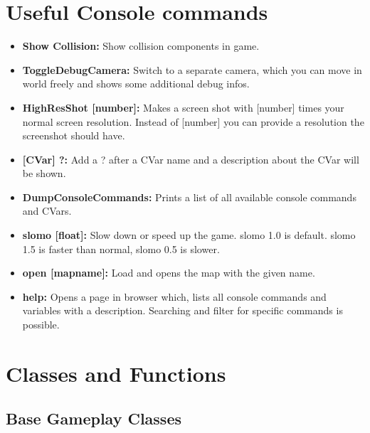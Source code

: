 \documentclass[10pt]{article}
\begin{document}
\begin{multicols*}{5}
	\section{Useful Console commands}
	\begin{itemize}
		\item \textbf{Show Collision:} Show collision components in game.
		\item \textbf{ToggleDebugCamera:} Switch to a separate camera, which you can move in world freely and shows some additional debug infos.
		\item \textbf{HighResShot [number]:} Makes a screen shot with [number] times your normal screen resolution. Instead of [number] you can provide a resolution the screenshot should have.
		\item \textbf{[CVar] ?:} Add a ? after a CVar name and a description about the CVar will be shown.
		\item \textbf{DumpConsoleCommands:} Prints a list of all available console commands and CVars.
		\item \textbf{slomo [float]:} Slow down or speed up the game. slomo 1.0 is default. slomo 1.5 is faster than normal, slomo 0.5 is slower.
		\item \textbf {open [mapname]:} Load and opens the map with the given name.
		\item \textbf{help:} Opens a page in browser which, lists all console commands and variables with a description. Searching and filter for specific commands is possible.
	\end{itemize}
	
	\section{Classes and Functions}

	\subsection{Base Gameplay Classes}
	

\end{multicols*}
\end{document}
